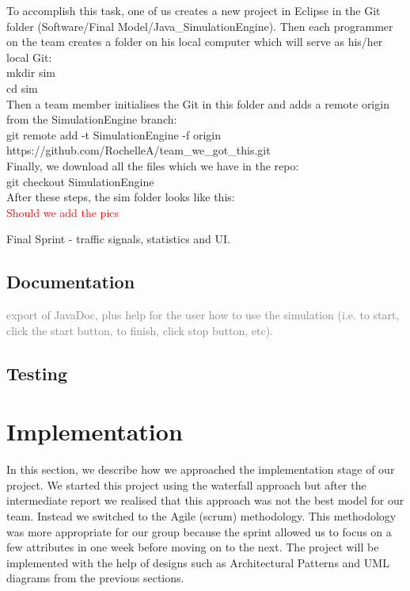 \documentclass{article}
\begin{document}
	\noindent
	To accomplish this task, one of us creates a new project in Eclipse in the Git folder (Software/Final Model/Java\_SimulationEngine). 
	Then each programmer on the team creates a folder on his local computer which will serve as his/her local Git:\\
	
	mkdir sim\\
	
	cd sim\\
	
	\noindent
	Then a team member initialises the Git in this folder and adds a remote origin from the SimulationEngine branch:\\
	
	\noindent
	git remote add -t SimulationEngine -f origin https://github.com/RochelleA/team\_we\_got\_this.git\\
	
	\noindent
	Finally, we download all the files which we have in the repo:\\
	
	\noindent
	git checkout SimulationEngine\\
	
	\noindent
	After these steps, the sim folder looks like this: \\
	\textcolor{red}{Should we add the pics}
	
	Final Sprint - traffic signals, statistics and UI. 
	
	\subsection{Documentation}
	\textcolor{gray}{export of JavaDoc, plus help for the user how to use the simulation (i.e. to start, click the start button, to finish, click stop button, etc).}
	
	
	\subsection{Testing}
  


\section*{Implementation}
In this section, we describe how we approached the implementation stage of
our project. We started this project using the waterfall approach but after the intermediate report we realised that this approach was not the best model for our team. Instead we switched to the Agile (scrum) methodology. This methodology was more appropriate for our group because the sprint allowed us to focus on a few attributes in one week before moving on to the next. The project will be implemented with the help of designs such as Architectural Patterns and UML diagrams from the previous sections.
\end{document}
